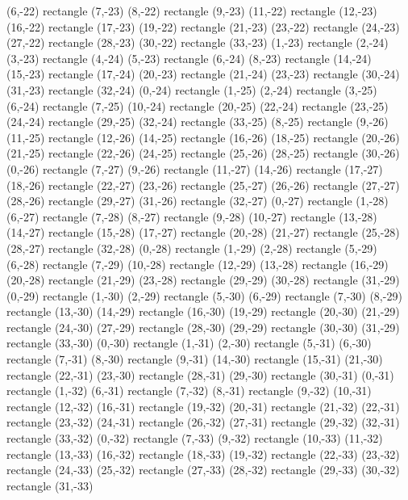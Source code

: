 {  (6,-22) rectangle (7,-23) (8,-22) rectangle (9,-23) (11,-22) rectangle (12,-23) (16,-22) rectangle (17,-23) (19,-22) rectangle (21,-23) (23,-22) rectangle (24,-23) (27,-22) rectangle (28,-23) (30,-22) rectangle (33,-23)%
  (1,-23) rectangle (2,-24) (3,-23) rectangle (4,-24) (5,-23) rectangle (6,-24) (8,-23) rectangle (14,-24) (15,-23) rectangle (17,-24) (20,-23) rectangle (21,-24) (23,-23) rectangle (30,-24) (31,-23) rectangle (32,-24)%
  (0,-24) rectangle (1,-25) (2,-24) rectangle (3,-25) (6,-24) rectangle (7,-25) (10,-24) rectangle (20,-25) (22,-24) rectangle (23,-25) (24,-24) rectangle (29,-25) (32,-24) rectangle (33,-25)%
  (8,-25) rectangle (9,-26) (11,-25) rectangle (12,-26) (14,-25) rectangle (16,-26) (18,-25) rectangle (20,-26) (21,-25) rectangle (22,-26) (24,-25) rectangle (25,-26) (28,-25) rectangle (30,-26)%
  (0,-26) rectangle (7,-27) (9,-26) rectangle (11,-27) (14,-26) rectangle (17,-27) (18,-26) rectangle (22,-27) (23,-26) rectangle (25,-27) (26,-26) rectangle (27,-27) (28,-26) rectangle (29,-27) (31,-26) rectangle (32,-27)%
  (0,-27) rectangle (1,-28) (6,-27) rectangle (7,-28) (8,-27) rectangle (9,-28) (10,-27) rectangle (13,-28) (14,-27) rectangle (15,-28) (17,-27) rectangle (20,-28) (21,-27) rectangle (25,-28) (28,-27) rectangle (32,-28)%
  (0,-28) rectangle (1,-29) (2,-28) rectangle (5,-29) (6,-28) rectangle (7,-29) (10,-28) rectangle (12,-29) (13,-28) rectangle (16,-29) (20,-28) rectangle (21,-29) (23,-28) rectangle (29,-29) (30,-28) rectangle (31,-29)%
  (0,-29) rectangle (1,-30) (2,-29) rectangle (5,-30) (6,-29) rectangle (7,-30) (8,-29) rectangle (13,-30) (14,-29) rectangle (16,-30) (19,-29) rectangle (20,-30) (21,-29) rectangle (24,-30) (27,-29) rectangle (28,-30) (29,-29) rectangle (30,-30) (31,-29) rectangle (33,-30)%
  (0,-30) rectangle (1,-31) (2,-30) rectangle (5,-31) (6,-30) rectangle (7,-31) (8,-30) rectangle (9,-31) (14,-30) rectangle (15,-31) (21,-30) rectangle (22,-31) (23,-30) rectangle (28,-31) (29,-30) rectangle (30,-31)%
  (0,-31) rectangle (1,-32) (6,-31) rectangle (7,-32) (8,-31) rectangle (9,-32) (10,-31) rectangle (12,-32) (16,-31) rectangle (19,-32) (20,-31) rectangle (21,-32) (22,-31) rectangle (23,-32) (24,-31) rectangle (26,-32) (27,-31) rectangle (29,-32) (32,-31) rectangle (33,-32)%
  (0,-32) rectangle (7,-33) (9,-32) rectangle (10,-33) (11,-32) rectangle (13,-33) (16,-32) rectangle (18,-33) (19,-32) rectangle (22,-33) (23,-32) rectangle (24,-33) (25,-32) rectangle (27,-33) (28,-32) rectangle (29,-33) (30,-32) rectangle (31,-33)%
}
